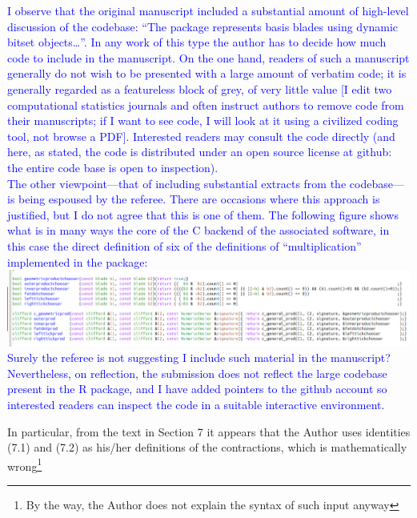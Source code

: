 \documentclass{article}
\begin{document}
\begin{itemize}
    \textcolor{blue}{I observe that the original manuscript included a
      substantial amount of high-level discussion of the codebase:
      ``The package represents basis blades using dynamic bitset
      objects\ldots''.  In any work of this type the author has to
      decide how much code to include in the manuscript.  On the one
      hand, readers of such a manuscript generally do not wish to be
      presented with a large amount of verbatim code; it is generally
      regarded as a featureless block of grey, of very little value [I
        edit two computational statistics journals and often instruct
        authors to remove code from their manuscripts; if I want to
        see code, I will look at it using a civilized coding tool, not
        browse a PDF].  Interested readers may consult the code
      directly (and here, as stated, the code is distributed under an
      open source license at github: the entire code base is open to
      inspection).\\[10pt] The other viewpoint---that of including
      substantial extracts from the codebase---is being espoused by
      the referee.  There are occasions where this approach is
      justified, but I do not agree that this is one of them.  The
      following figure shows what is in many ways the core of the C
      backend of the associated software, in this case the direct
      definition of six of the definitions of ``multiplication''
      implemented in the package:\\[10pt]
      \includegraphics[width=6in]{code.png}\\[10pt] Surely the referee
      is not suggesting I include such material in the manuscript?
      Nevertheless, on reflection, the submission does not reflect the
      large codebase present in the R package, and I have added
      pointers to the github account so interested readers can inspect
      the code in a suitable interactive environment.}

    In particular, from the text in Section 7 it appears that the
    Author uses identities (7.1) and (7.2) as his/her definitions of
    the contractions, which is mathematically wrong\footnote{By the
    way, the Author does not explain the syntax of such input anyway}


\end{itemize}
\end{document}
